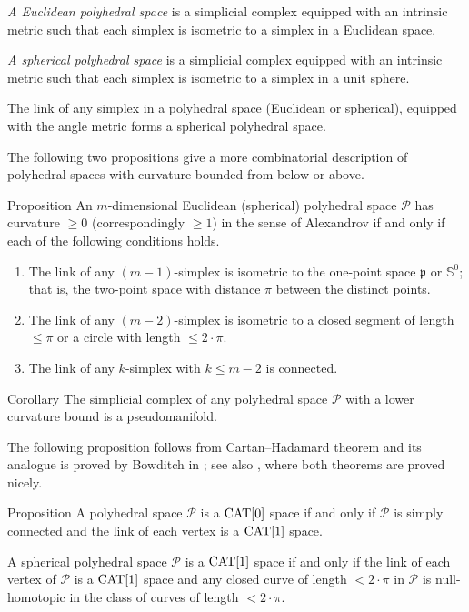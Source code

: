 \documentclass[oneside,a4paper]{article}
\begin{document}
\emph{A Euclidean polyhedral space} is a simplicial complex equipped with an intrinsic metric such that each simplex is isometric to a simplex in a Euclidean space.

\emph{A spherical polyhedral space} is a simplicial complex equipped with an intrinsic metric such that each simplex is isometric to a simplex in a unit sphere.

The link of any simplex in a polyhedral space
(Euclidean or spherical),
equipped with the angle metric forms a spherical polyhedral space.

The following two propositions give a more combinatorial description of polyhedral spaces with curvature bounded from below or above.

\begin{thm}{Proposition}\label{prop:poly-cbb}
An $m$-dimensional Euclidean (spherical) polyhedral space $\mathcal{P}$
has curvature $\ge 0$ (correspondingly $\ge 1$)
in the sense of Alexandrov
if and only if each of the following conditions holds.
\begin{enumerate}
\item The link of any $(m-1)$-simplex is isometric to the one-point space $\mathfrak{p}$ or $\mathbb{S}^0$; 
that is, the two-point space with distance $\pi$ between the distinct points.
\item The link of any $(m-2)$-simplex is isometric to a closed segment of length $\le \pi$ or a circle with length $\le2\cdot\pi$.
\item The link of any $k$-simplex with $k\le m-2$ is connected.
\end{enumerate}

\end{thm}

\begin{thm}{Corollary}
The simplicial complex of any polyhedral space $\mathcal{P}$ with a lower curvature bound is a pseudomanifold.
\end{thm}

The following proposition
follows from Cartan--Hadamard theorem
and its analogue is proved by Bowditch in \cite{bowditch};
see also \cite{akp}, where both theorems are proved nicely.

\begin{thm}{Proposition}\label{prop:poly-cba}
A  polyhedral space $\mathcal{P}$ is a $\mathrm{CAT}[0]$ space
if and only if $\mathcal{P}$ is simply connected
and the link of each vertex is a $\mathrm{CAT}[1]$ space.

A spherical polyhedral space $\mathcal{P}$
is a $\mathrm{CAT}[1]$ space
if and only if  the link of each vertex of $\mathcal{P}$ is a $\mathrm{CAT}[1]$ space
and any closed curve of length $<2\cdot\pi$ in $\mathcal{P}$ is null-homotopic in the class of curves of length $<2\cdot\pi$.
\end{thm}
\end{document}
